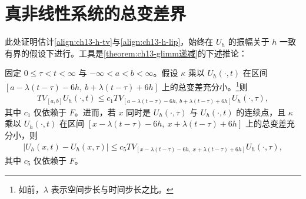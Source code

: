 \documentclass[../../main.tex]{subfiles}
\begin{document}
\section{真非线性系统的总变差界}\label{section:ch13-总变差界}

此处证明估计\eqref{align:ch13-h-tv}与\eqref{align:ch13-h-lip}，始终在 $U_h$ 的振幅关于 $h$ 一致有界的假设下进行。工具是\cref{theorem:ch13-glimm递减}的下述推论：

\begin{theorem}[总变差的局部界]\label{theorem:ch13-tv局部界}
固定 $0\leqslant\tau<t<\infty$ 与 $-\infty<a<b<\infty$。假设 $\kappa$ 乘以 $U_h(\cdot,t)$ 在区间 $[a-\lambda(t-\tau)-6h,\ b+\lambda(t-\tau)+6h]$ 上的总变差充分小。\footnote{如前，$\lambda$ 表示空间步长与时间步长之比。}则
\begin{align}
TV_{[a,b]}U_h(\cdot,t)\leqslant c_1TV_{[a-\lambda(t-\tau)-6h,\ b+\lambda(t-\tau)+6h]}U_h(\cdot,\tau),
\label{align:ch13-tv-local}
\end{align}
其中 $c_1$ 仅依赖于 $F$。进而，若 $x$ 同时是 $U_h(\cdot,\tau)$ 与 $U_h(\cdot,t)$ 的连续点，且 $\kappa$ 乘以 $U_h(\cdot,t)$ 在区间 $[x-\lambda(t-\tau)-6h,\ x+\lambda(t-\tau)+6h]$ 上的总变差充分小，则
\begin{align}
|U_h(x,t)-U_h(x,\tau)|\leqslant c_5TV_{[x-\lambda(t-\tau)-6h,\ x+\lambda(t-\tau)+6h]}U_h(\cdot,\tau),
\label{align:ch13-osc-local}
\end{align}
其中 $c_5$ 仅依赖于 $F$。
\end{theorem}
\end{document}
